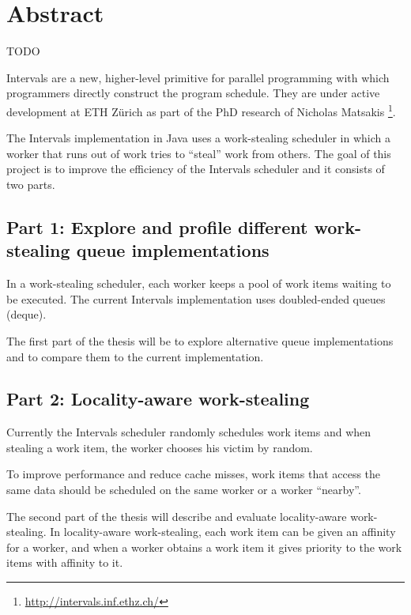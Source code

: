 
\chapter*{Abstract}
\label{chap:abstract}

TODO

Intervals are a new, higher-level primitive for parallel programming
with which programmers directly construct the program schedule. They
are under active development at ETH Zürich as part of the PhD research
of Nicholas Matsakis \footnote{\url{http://intervals.inf.ethz.ch/}}.

The Intervals implementation in Java uses a work-stealing scheduler in
which a worker that runs out of work tries to ``steal'' work from
others. The goal of this project is to improve the efficiency of the
Intervals scheduler and it consists of two parts.

\section*{Part 1: Explore and profile different work-stealing queue
  implementations}
\label{sec:abstract-part1}

In a work-stealing scheduler, each worker keeps a pool of work items
waiting to be executed. The current Intervals implementation uses
doubled-ended queues (deque).

The first part of the thesis will be to explore alternative queue
implementations and to compare them to the current implementation.

\section*{Part 2: Locality-aware work-stealing}
\label{sec:abstract-part2}

Currently the Intervals scheduler randomly schedules work items and
when stealing a work item, the worker chooses his victim by random.

To improve performance and reduce cache misses, work items that access
the same data should be scheduled on the same worker or a worker
``nearby''.

The second part of the thesis will describe and evaluate
locality-aware work-stealing. In locality-aware work-stealing, each
work item can be given an affinity for a worker, and when a worker
obtains a work item it gives priority to the work items with affinity
to it.

